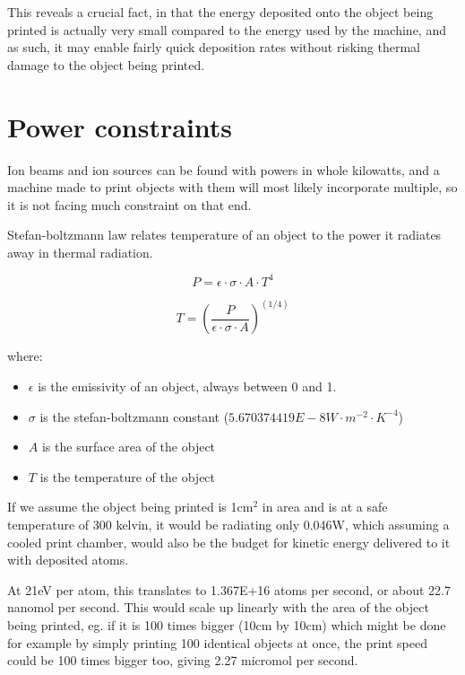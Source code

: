 \documentclass[a4paper]{article}
\begin{document}
	\medskip
	
	This reveals a crucial fact, in that the energy deposited onto the object being printed is actually very small compared to the energy used by the machine, and as such, it may enable fairly quick deposition rates without risking thermal damage to the object being printed.
	
	\pagebreak
	
	\section{Power constraints}
	
	Ion beams and ion sources can be found with powers in whole kilowatts, and a machine made to print objects with them will most likely incorporate multiple, so it is not facing much constraint on that end.
	
	\bigskip
	
	Stefan-boltzmann law relates temperature of an object to the power it radiates away in thermal radiation.
	
	$$ P = \epsilon \cdot \sigma \cdot A \cdot T^4 $$
	
	$$ T = \left( \frac{P}{\epsilon \cdot \sigma \cdot A} \right)^{(1/4)} $$
	
	where:
	
	\begin{itemize}
		\item $\epsilon$ is the emissivity of an object, always between 0 and 1.
		
		\item $\sigma$ is the stefan-boltzmann constant ($5.670374419E-8 W \cdot m^{-2} \cdot K^{-4}$)
		
		\item $A$ is the surface area of the object
		
		\item $T$ is the temperature of the object
	\end{itemize}
	
	If we assume the object being printed is 1cm$^2$ in area and is at a safe temperature of 300 kelvin, it would be radiating only 0.046W, which assuming a cooled print chamber, would also be the budget for kinetic energy delivered to it with deposited atoms.
	
	\medskip
	
	At 21eV per atom, this translates to 1.367E+16 atoms per second, or about 22.7 nanomol per second.
	This would scale up linearly with the area of the object being printed, eg. if it is 100 times bigger (10cm by 10cm) which might be done for example by simply printing 100 identical objects at once, the print speed could be 100 times bigger too, giving 2.27 micromol per second.
	
\end{document}
